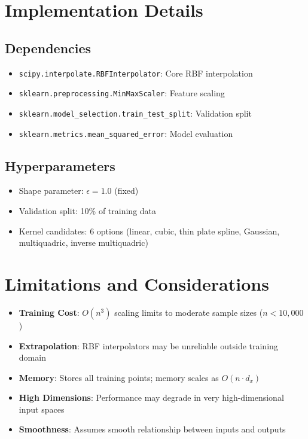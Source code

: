 \documentclass[11pt]{article}
\begin{document}
\section{Implementation Details}

\subsection{Dependencies}
\begin{itemize}
    \item \texttt{scipy.interpolate.RBFInterpolator}: Core RBF interpolation
    \item \texttt{sklearn.preprocessing.MinMaxScaler}: Feature scaling
    \item \texttt{sklearn.model\_selection.train\_test\_split}: Validation split
    \item \texttt{sklearn.metrics.mean\_squared\_error}: Model evaluation
\end{itemize}

\subsection{Hyperparameters}
\begin{itemize}
    \item Shape parameter: $\epsilon = 1.0$ (fixed)
    \item Validation split: 10\% of training data
    \item Kernel candidates: 6 options (linear, cubic, thin plate spline, Gaussian, multiquadric, inverse multiquadric)
\end{itemize}

\section{Limitations and Considerations}

\begin{itemize}
    \item \textbf{Training Cost}: $O(n^3)$ scaling limits to moderate sample sizes ($n < 10,000$)
    \item \textbf{Extrapolation}: RBF interpolators may be unreliable outside training domain
    \item \textbf{Memory}: Stores all training points; memory scales as $O(n \cdot d_x)$
    \item \textbf{High Dimensions}: Performance may degrade in very high-dimensional input spaces
    \item \textbf{Smoothness}: Assumes smooth relationship between inputs and outputs
\end{itemize}
\end{document}
